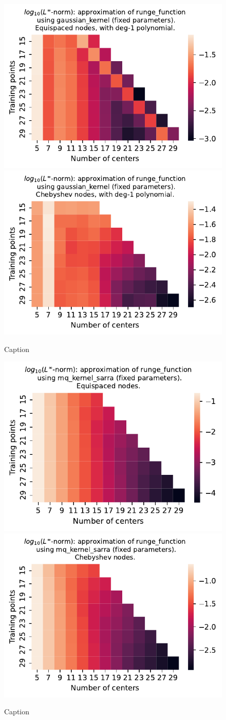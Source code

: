 \documentclass[12pt]{report} %
\begin{document}
\begin{figure}[ht]
    \centering
    
    \includegraphics[width=.49\textwidth]{imagenes/experiments/1d/least_squares/opt-runge_function-Kgaussian_kernel-Poly-Equi.pdf}
    \includegraphics[width=.49\textwidth]{imagenes/experiments/1d/least_squares/opt-runge_function-Kgaussian_kernel-Poly-Cheb.pdf}
    \caption{Caption}
    \label{fig:opt-runge-gaussian-poly}
\end{figure}

\begin{figure}[ht]
    \centering
    
    \includegraphics[width=.49\textwidth]{imagenes/experiments/1d/least_squares/opt-runge_function-Kmq_kernel_sarra-Equi.pdf}
    \includegraphics[width=.49\textwidth]{imagenes/experiments/1d/least_squares/opt-runge_function-Kmq_kernel_sarra-Cheb.pdf}
    \caption{Caption}
    \label{fig:opt-runge-sarra}
\end{figure}
\end{document}
